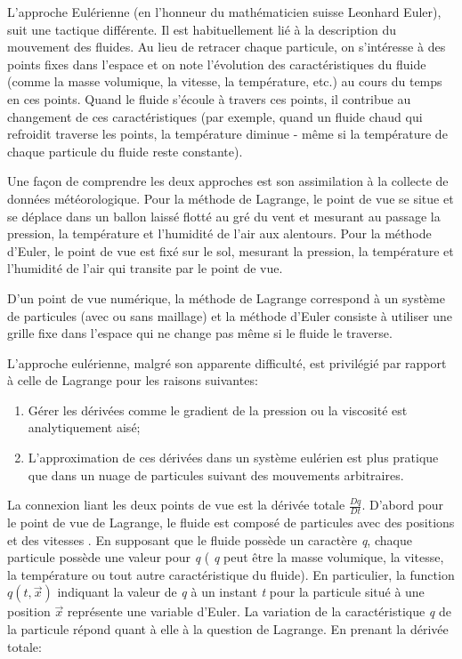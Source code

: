 \documentclass[11pt]{report}
\begin{document}
L'approche Eulérienne (en l'honneur du mathématicien suisse Leonhard Euler), suit une tactique différente. Il est habituellement lié à la description du mouvement des fluides. Au lieu de retracer chaque particule, on s'intéresse à des points fixes dans l'espace et on note l'évolution des caractéristiques du fluide (comme la masse volumique, la vitesse, la température, etc.) au cours du temps en ces points. Quand le fluide s'écoule à travers ces points, il contribue au changement de ces caractéristiques (par exemple, quand un fluide chaud qui refroidit traverse les points, la température diminue - même si la température de chaque particule du fluide reste constante). \newline

Une façon de comprendre les deux approches est son assimilation à la collecte de données météorologique. Pour la méthode de Lagrange, le point de vue se situe et se déplace dans un ballon laissé flotté au gré du vent et mesurant au passage la pression, la température et l'humidité de l'air aux alentours. Pour la méthode d'Euler, le point de vue est fixé sur le sol, mesurant la pression, la température et l'humidité de l'air qui transite par le point de vue. \newline

D'un point de vue numérique, la méthode de Lagrange correspond à un système de particules (avec ou sans maillage) et la méthode d'Euler consiste à utiliser une grille fixe dans l'espace qui ne change pas même si le fluide le traverse. \newline

L'approche eulérienne, malgré son apparente difficulté, est privilégié par rapport à celle de Lagrange pour les raisons suivantes:

\begin{enumerate}
\item Gérer les dérivées comme le gradient de la pression ou la viscosité est analytiquement aisé; 
\item L'approximation de ces dérivées dans un système eulérien est plus pratique que dans un nuage de particules suivant des mouvements arbitraires.\newline
\end{enumerate}

La connexion liant les deux points de vue est la dérivée totale $ \frac{Dq}{Dt} $. D'abord pour le point de vue de Lagrange, le fluide est composé de particules avec des positions  et des vitesses . En supposant que le fluide possède un caractère \textit{q}, chaque particule possède une valeur pour \textit{q} ( \textit{q} peut être la masse volumique, la vitesse, la température ou tout autre caractéristique du fluide). En particulier, la function $ q(t,\overrightarrow{x}) $ indiquant la valeur de \textit{q} à un instant \textit{t} pour la particule situé à une position $ \overrightarrow{x} $ représente une variable d'Euler. La variation de la caractéristique \textit{q}  de la particule répond quant à elle à la question de Lagrange. En prenant la dérivée totale:
\end{document}
